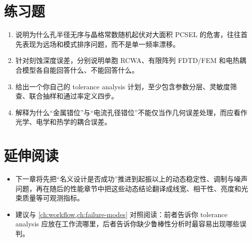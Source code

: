 \section*{练习题}
\begin{enumerate}
  \item \basicq 说明为什么孔半径无序与晶格常数随机起伏对大面积 PCSEL 的危害，往往首先表现为远场和模式排序问题，而不是单一频率漂移。

  \item \basicq 针对刻蚀深度误差，分别说明单胞 RCWA、有限阵列 FDTD/FEM 和电热耦合模型各自能回答什么、不能回答什么。

  \item \midq 给出一个你自己的 tolerance analysis 计划，至少包含参数分层、灵敏度筛查、联合抽样和通过率定义四步。

  \item \hardq 解释为什么“金属错位”与“电流孔径错位”不能仅当作几何误差处理，而应看作光学、电学和热学的耦合误差。
\end{enumerate}

\section*{延伸阅读}
\begin{itemize}
  \item 下一章将先把“名义设计是否成功”推进到起振以上的动态稳定性、调制与噪声问题，再在随后的性能章节中把这些动态结论翻译成线宽、相干性、亮度和光束质量等可观测指标。

  \item 建议与 \cref{ch:workflow,ch:failure-modes} 对照阅读：前者告诉你 tolerance analysis 应放在工作流哪里，后者告诉你缺少鲁棒性分析时最容易出现哪些误判。
\end{itemize}


